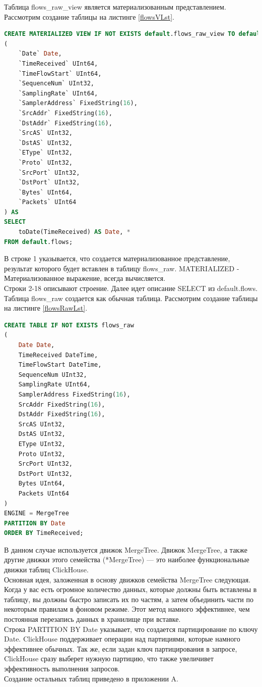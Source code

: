 Таблица flows\_raw\_view является материализованным представлением.
Рассмотрим создание таблицы на листинге \ref{flowsVLst}.
\begin{lstlisting}[label={flowsVLst}, language=SQL]
CREATE MATERIALIZED VIEW IF NOT EXISTS default.flows_raw_view TO default.flows_raw
(
    `Date` Date,
    `TimeReceived` UInt64,
    `TimeFlowStart` UInt64,
    `SequenceNum` UInt32,
    `SamplingRate` UInt64,
    `SamplerAddress` FixedString(16),
    `SrcAddr` FixedString(16),
    `DstAddr` FixedString(16),
    `SrcAS` UInt32,
    `DstAS` UInt32,
    `EType` UInt32,
    `Proto` UInt32,
    `SrcPort` UInt32,
    `DstPort` UInt32,
    `Bytes` UInt64,
    `Packets` UInt64
) AS
SELECT
    toDate(TimeReceived) AS Date, *
FROM default.flows;
\end{lstlisting}
В строке 1 указывается, что создается материализованное представление, результат которого будет вставлен в таблицу flows\_raw. MATERIALIZED - Материализованное выражение, всегда вычисляется.\\
Строки 2-18 описывают строение. Далее идет описание SELECT из default.flows.
Таблица flows\_raw создается как обычная таблица. Рассмотрим создание таблицы на листинге \ref{flowsRawLst}.
\begin{lstlisting}[label={flowsRawLst}, language=SQL]
CREATE TABLE IF NOT EXISTS flows_raw
(
    Date Date,
    TimeReceived DateTime,
    TimeFlowStart DateTime,
    SequenceNum UInt32,
    SamplingRate UInt64,
    SamplerAddress FixedString(16),
    SrcAddr FixedString(16),
    DstAddr FixedString(16),
    SrcAS UInt32,
    DstAS UInt32,
    EType UInt32,
    Proto UInt32,
    SrcPort UInt32,
    DstPort UInt32,
    Bytes UInt64,
    Packets UInt64
)
ENGINE = MergeTree
PARTITION BY Date
ORDER BY TimeReceived;
\end{lstlisting}
В данном случае используется движок MergeTree. Движок MergeTree, а также другие движки этого семейства (*MergeTree) — это наиболее функциональные движки таблиц ClickHouse. \\
Основная идея, заложенная в основу движков семейства MergeTree следующая. Когда у вас есть огромное количество данных, которые должны быть вставлены в таблицу, вы должны быстро записать их по частям, а затем объединить части по некоторым правилам в фоновом режиме. Этот метод намного эффективнее, чем постоянная перезапись данных в хранилище при вставке\cite{clickhouse-mergetree}. \\
\indent Строка PARTITION BY Date указывает, что создается партицирование по ключу Date. ClickHouse поддерживает операции над партициями, которые намного эффективнее обычных. Так же, если задан ключ партицирования в запросе, ClickHouse сразу выберет нужную партицию, что также увеличивет эффективность выполнения запросов. \\
\indent Создание остальных таблиц приведено в приложении A.


